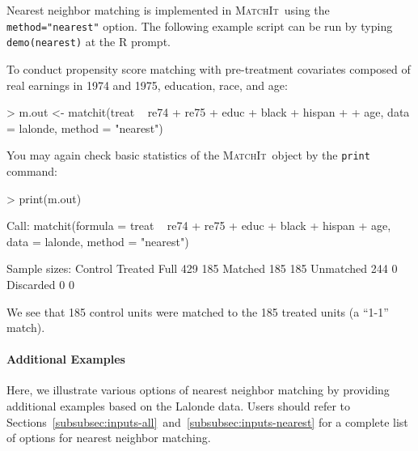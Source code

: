 \documentclass[oneside,letterpaper,titlepage]{article}
\newcommand{\MatchIt}{\textsc{MatchIt}}
\begin{document}
Nearest neighbor matching is implemented in \MatchIt\ using the
\texttt{method="nearest"} option.  The following example script can be
run by typing {\tt demo(nearest)} at the R prompt.

To conduct propensity score matching with pre-treatment covariates
composed of real earnings in 1974 and 1975, education, race, and age:

\begin{Schunk}
\begin{Sinput}
> m.out <- matchit(treat ~ re74 + re75 + educ + black + hispan + 
+     age, data = lalonde, method = "nearest")
\end{Sinput}
\end{Schunk}

\noindent You may again check basic statistics of the \MatchIt\ object by the
\texttt{print} command:
\begin{Schunk}
\begin{Sinput}
> print(m.out)
\end{Sinput}
\begin{Soutput}

Call: matchit(formula = treat ~ re74 + re75 + educ + black + hispan +     age, data = lalonde, method = "nearest")

Sample sizes:
          Control Treated
Full          429     185
Matched       185     185
Unmatched     244       0
Discarded       0       0


\end{Soutput}
\end{Schunk}

We see that 185 control units were matched to the 185 treated units (a
``1-1'' match).  

\paragraph{Additional Examples}
Here, we illustrate various options of nearest neighbor matching by
providing additional examples based on the Lalonde data. Users should
refer to
Sections~\ref{subsubsec:inputs-all}~and~\ref{subsubsec:inputs-nearest}
for a complete list of options for nearest neighbor matching.
\end{document}
